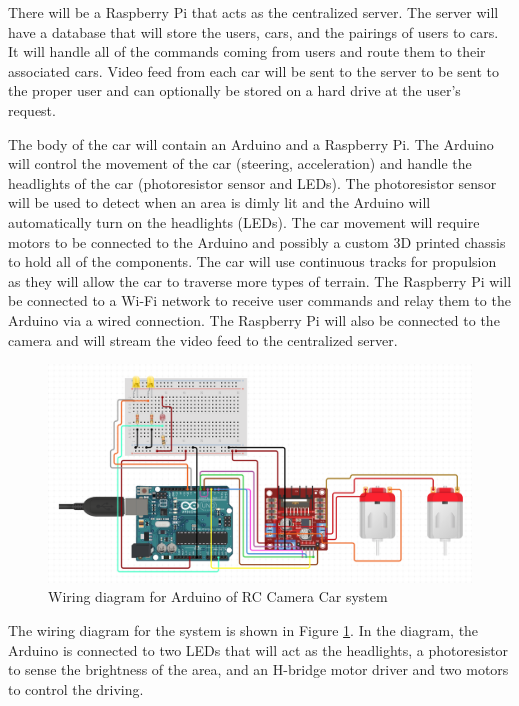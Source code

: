 \documentclass[letterpaper,12pt]{report}
\begin{document}
	There will be a Raspberry Pi that acts as the centralized server. The server
	will have a database that will store the users, cars, and the pairings of
	users to cars. It will handle all of the commands coming from users and
	route them to their associated cars. Video feed from each car will be sent
	to the server to be sent to the proper user and can optionally be stored on
	a hard drive at the user’s request.

	The body of the car will contain an Arduino and a Raspberry Pi. The Arduino
	will control the movement of the car (steering, acceleration) and handle the
	headlights of the car (photoresistor sensor and LEDs). The photoresistor
	sensor will be used to detect when an area is dimly lit and the Arduino will
	automatically turn on the headlights (LEDs). The car movement will require
	motors to be connected to the Arduino and possibly a custom 3D printed
	chassis to hold all of the components. The car will use continuous tracks
	for propulsion as they will allow the car to traverse more types of terrain.
	The Raspberry Pi will be connected to a Wi-Fi network to receive user
	commands and relay them to the Arduino via a wired connection. The Raspberry
	Pi will also be connected to the camera and will stream the video feed to
	the centralized server.

	\begin{figure}[H]
    	\centering
		\includegraphics[width=\linewidth]{Proposal_Wiring_Diagram.png}
    	\caption{Wiring diagram for Arduino of RC Camera Car system}
    	\label{fig:wiring}
	\end{figure}

	The wiring diagram for the system is shown in Figure \ref{fig:wiring}. In
	the diagram, the Arduino is connected to two LEDs that will act as the
	headlights, a photoresistor to sense the brightness of the area, and an
	H-bridge motor driver and two motors to control the driving.
\end{document}
